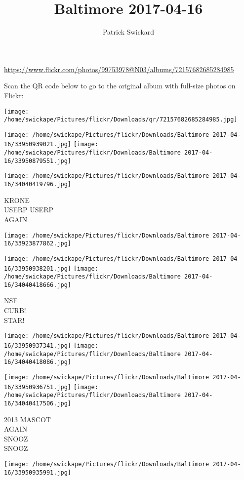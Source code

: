 \documentclass[10pt,letterpaper]{article}
\title{Baltimore 2017-04-16}
\author{Patrick Swickard}
\date{}
\begin{document}
\maketitle

\url{https://www.flickr.com/photos/99753978@N03/albums/72157682685284985}

Scan the QR code below to go to the original album with full-size photos on Flickr:

\texttt{[image: /home/swickape/Pictures/flickr/Downloads/qr/72157682685284985.jpg]}
\pagebreak

\texttt{[image: /home/swickape/Pictures/flickr/Downloads/Baltimore 2017-04-16/33950939021.jpg]}
\texttt{[image: /home/swickape/Pictures/flickr/Downloads/Baltimore 2017-04-16/33950879551.jpg]}

\texttt{[image: /home/swickape/Pictures/flickr/Downloads/Baltimore 2017-04-16/34040419796.jpg]}

KRONE\\
USERP USERP\\
AGAIN
\pagebreak

\texttt{[image: /home/swickape/Pictures/flickr/Downloads/Baltimore 2017-04-16/33923877862.jpg]}

\vspace{0.25in}
\texttt{[image: /home/swickape/Pictures/flickr/Downloads/Baltimore 2017-04-16/33950938201.jpg]}
\texttt{[image: /home/swickape/Pictures/flickr/Downloads/Baltimore 2017-04-16/34040418666.jpg]}

NSF\\
CURB!\\
STAR!
\pagebreak

\texttt{[image: /home/swickape/Pictures/flickr/Downloads/Baltimore 2017-04-16/33950937341.jpg]}
\texttt{[image: /home/swickape/Pictures/flickr/Downloads/Baltimore 2017-04-16/34040418086.jpg]}

\texttt{[image: /home/swickape/Pictures/flickr/Downloads/Baltimore 2017-04-16/33950936751.jpg]}
\texttt{[image: /home/swickape/Pictures/flickr/Downloads/Baltimore 2017-04-16/34040417506.jpg]}

2013 MASCOT\\
AGAIN\\
SNOOZ\\
SNOOZ
\pagebreak

\texttt{[image: /home/swickape/Pictures/flickr/Downloads/Baltimore 2017-04-16/33950935991.jpg]}
\end{document}
